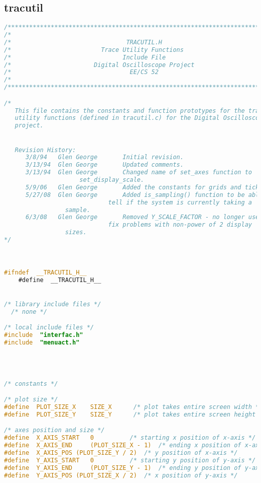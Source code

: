 \subsection{tracutil}
\begin{lstlisting}[language=C]
/****************************************************************************/
/*                                                                          */
/*                                TRACUTIL.H                                */
/*                         Trace Utility Functions                          */
/*                               Include File                               */
/*                       Digital Oscilloscope Project                       */
/*                                 EE/CS 52                                 */
/*                                                                          */
/****************************************************************************/

/*
   This file contains the constants and function prototypes for the trace
   utility functions (defined in tracutil.c) for the Digital Oscilloscope
   project.


   Revision History:
      3/8/94   Glen George       Initial revision.
      3/13/94  Glen George       Updated comments.
      3/13/94  Glen George       Changed name of set_axes function to
      				 set_display_scale.
      5/9/06   Glen George       Added the constants for grids and tick marks.
      5/27/08  Glen George       Added is_sampling() function to be able to
	                         tell if the system is currently taking a
				 sample.
      6/3/08   Glen George       Removed Y_SCALE_FACTOR - no longer used to 
	                         fix problems with non-power of 2 display
				 sizes.
*/



#ifndef  __TRACUTIL_H__
    #define  __TRACUTIL_H__


/* library include files */
  /* none */

/* local include files */
#include  "interfac.h"
#include  "menuact.h"




/* constants */

/* plot size */
#define  PLOT_SIZE_X	SIZE_X		/* plot takes entire screen width */
#define  PLOT_SIZE_Y	SIZE_Y		/* plot takes entire screen height */

/* axes position and size */
#define  X_AXIS_START   0		   /* starting x position of x-axis */
#define  X_AXIS_END     (PLOT_SIZE_X - 1)  /* ending x position of x-axis */
#define  X_AXIS_POS	(PLOT_SIZE_Y / 2)  /* y position of x-axis */
#define  Y_AXIS_START   0		   /* starting y position of y-axis */
#define  Y_AXIS_END     (PLOT_SIZE_Y - 1)  /* ending y position of y-axis */
#define  Y_AXIS_POS	(PLOT_SIZE_X / 2)  /* x position of y-axis */


\end{lstlisting}
